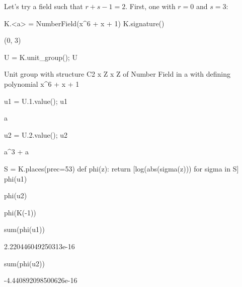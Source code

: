 Let's try a field such that $r+s-1=2$.  First, one with $r=0$ and
$s=3$:
\begin{sagecode}
\begin{sagecell}
K.<a> = NumberField(x^6 + x + 1)
K.signature()
\end{sagecell}
\begin{sageout}
(0, 3)
\end{sageout}
\begin{sagecell}
U = K.unit_group(); U
\end{sagecell}
\begin{sageout}
Unit group with structure C2 x Z x Z of Number Field in a with
defining polynomial x^6 + x + 1
\end{sageout}
\begin{sagecell}
u1 = U.1.value(); u1
\end{sagecell}
\begin{sageout}
a
\end{sageout}
\begin{sagecell}
u2 = U.2.value(); u2
\end{sagecell}
\begin{sageout}
a^3 + a
\end{sageout}
\begin{sagecell}
S = K.places(prec=53)
def phi(z):
    return [log(abs(sigma(z))) for sigma in S]
phi(u1)
\end{sagecell}
\begin{sageout}
[-0.16741548328589614, 0.04864390975267338, 0.11877157353322298]
\end{sageout}
\begin{sagecell}
phi(u2)
\end{sagecell}
\begin{sageout}
[0.30678570892329504, -1.0725146505489758, 0.7657289416256803]
\end{sageout}
\begin{sagecell}
phi(K(-1))
\end{sagecell}
\begin{sageout}
[0.0, 0.0, 0.0]
\end{sageout}
\begin{sagecell}
sum(phi(u1))
\end{sagecell}
\begin{sageout}
2.220446049250313e-16
\end{sageout}
\begin{sagecell}
sum(phi(u2))
\end{sagecell}
\begin{sageout}
-4.440892098500626e-16
\end{sageout}
\end{sagecode}

